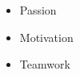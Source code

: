 %
%
%

\twocolumnsection
{
\begin{skills}
\end{skills}}
{
\vspace{1em}
\begin{itemize}
	\item Passion
	\item Motivation                   
    \item Teamwork
\end{itemize}
}
